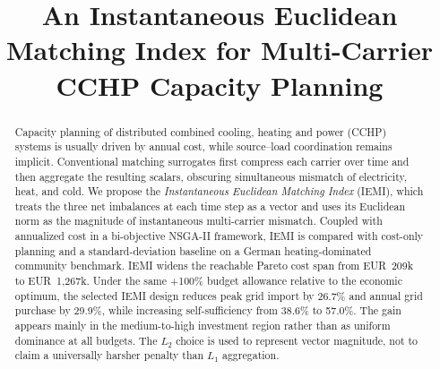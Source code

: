 \documentclass[conference]{IEEEtran}
\begin{document}
\title{An Instantaneous Euclidean Matching Index for Multi-Carrier CCHP Capacity Planning}

\author{
\and
{}
\and
{}
\and
{}
\and
{}
}

\maketitle

\begin{abstract}
Capacity planning of distributed combined cooling, heating and power (CCHP) systems is usually driven by annual cost, while source--load coordination remains implicit. Conventional matching surrogates first compress each carrier over time and then aggregate the resulting scalars, obscuring simultaneous mismatch of electricity, heat, and cold. We propose the \emph{Instantaneous Euclidean Matching Index} (IEMI), which treats the three net imbalances at each time step as a vector and uses its Euclidean norm as the magnitude of instantaneous multi-carrier mismatch. Coupled with annualized cost in a bi-objective NSGA-II framework, IEMI is compared with cost-only planning and a standard-deviation baseline on a German heating-dominated community benchmark. IEMI widens the reachable Pareto cost span from EUR~209k to EUR~1{,}267k. Under the same +100\% budget allowance relative to the economic optimum, the selected IEMI design reduces peak grid import by 26.7\% and annual grid purchase by 29.9\%, while increasing self-sufficiency from 38.6\% to 57.0\%. The gain appears mainly in the medium-to-high investment region rather than as uniform dominance at all budgets. The $L_2$ choice is used to represent vector magnitude, not to claim a universally harsher penalty than $L_1$ aggregation.
\end{abstract}
\end{document}
